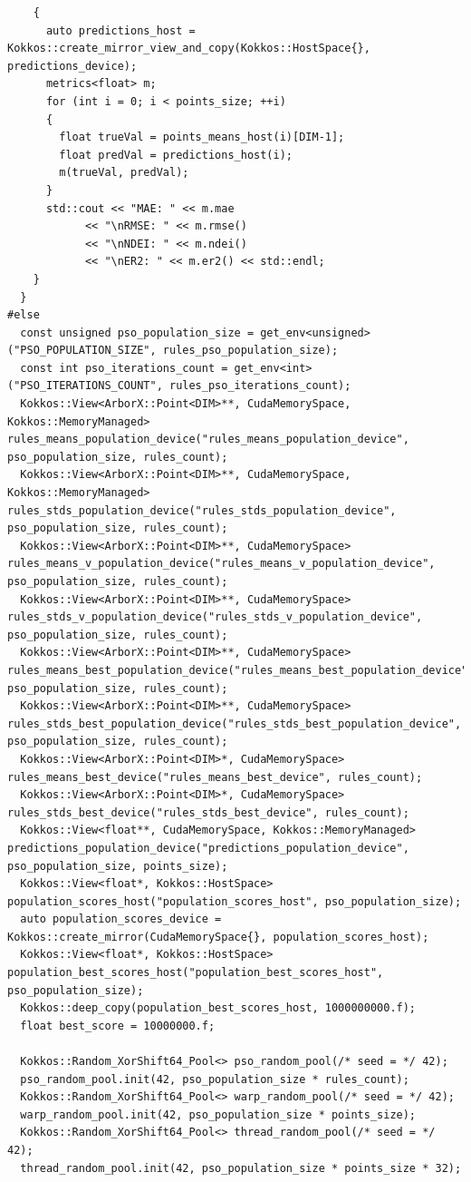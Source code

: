 \begin{verbatim}
    {
      auto predictions_host = Kokkos::create_mirror_view_and_copy(Kokkos::HostSpace{}, predictions_device);
      metrics<float> m;
      for (int i = 0; i < points_size; ++i)
      {
        float trueVal = points_means_host(i)[DIM-1];
        float predVal = predictions_host(i);
        m(trueVal, predVal);
      }
      std::cout << "MAE: " << m.mae
            << "\nRMSE: " << m.rmse()
            << "\nNDEI: " << m.ndei()
            << "\nER2: " << m.er2() << std::endl;
    }
  }
#else
  const unsigned pso_population_size = get_env<unsigned>("PSO_POPULATION_SIZE", rules_pso_population_size);
  const int pso_iterations_count = get_env<int>("PSO_ITERATIONS_COUNT", rules_pso_iterations_count);
  Kokkos::View<ArborX::Point<DIM>**, CudaMemorySpace, Kokkos::MemoryManaged> rules_means_population_device("rules_means_population_device", pso_population_size, rules_count);
  Kokkos::View<ArborX::Point<DIM>**, CudaMemorySpace, Kokkos::MemoryManaged> rules_stds_population_device("rules_stds_population_device", pso_population_size, rules_count);
  Kokkos::View<ArborX::Point<DIM>**, CudaMemorySpace> rules_means_v_population_device("rules_means_v_population_device", pso_population_size, rules_count);
  Kokkos::View<ArborX::Point<DIM>**, CudaMemorySpace> rules_stds_v_population_device("rules_stds_v_population_device", pso_population_size, rules_count);
  Kokkos::View<ArborX::Point<DIM>**, CudaMemorySpace> rules_means_best_population_device("rules_means_best_population_device", pso_population_size, rules_count);
  Kokkos::View<ArborX::Point<DIM>**, CudaMemorySpace> rules_stds_best_population_device("rules_stds_best_population_device", pso_population_size, rules_count);
  Kokkos::View<ArborX::Point<DIM>*, CudaMemorySpace> rules_means_best_device("rules_means_best_device", rules_count);
  Kokkos::View<ArborX::Point<DIM>*, CudaMemorySpace> rules_stds_best_device("rules_stds_best_device", rules_count);
  Kokkos::View<float**, CudaMemorySpace, Kokkos::MemoryManaged> predictions_population_device("predictions_population_device", pso_population_size, points_size);
  Kokkos::View<float*, Kokkos::HostSpace> population_scores_host("population_scores_host", pso_population_size);
  auto population_scores_device = Kokkos::create_mirror(CudaMemorySpace{}, population_scores_host);
  Kokkos::View<float*, Kokkos::HostSpace> population_best_scores_host("population_best_scores_host", pso_population_size);
  Kokkos::deep_copy(population_best_scores_host, 1000000000.f);
  float best_score = 10000000.f;

  Kokkos::Random_XorShift64_Pool<> pso_random_pool(/* seed = */ 42);
  pso_random_pool.init(42, pso_population_size * rules_count);
  Kokkos::Random_XorShift64_Pool<> warp_random_pool(/* seed = */ 42);
  warp_random_pool.init(42, pso_population_size * points_size);
  Kokkos::Random_XorShift64_Pool<> thread_random_pool(/* seed = */ 42);
  thread_random_pool.init(42, pso_population_size * points_size * 32);


\end{verbatim}
